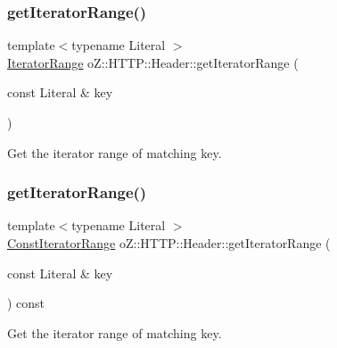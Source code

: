 \subsubsection{\texorpdfstring{getIteratorRange()}{getIteratorRange()}\hspace{0.1cm}{\footnotesize\ttfamily [1/2]}}
{\footnotesize\ttfamily template$<$typename Literal $>$ \\
\mbox{\hyperlink{classo_z_1_1_h_t_t_p_1_1_header_a226f04d25adf24d2a683f82ef8327812}{Iterator\+Range}} o\+Z\+::\+H\+T\+T\+P\+::\+Header\+::get\+Iterator\+Range (\begin{DoxyParamCaption}\item[{const Literal \&}]{key }\end{DoxyParamCaption})\hspace{0.3cm}{\ttfamily [inline]}}



Get the iterator range of matching key. 

\mbox{\label{classo_z_1_1_h_t_t_p_1_1_header_acecb2a9ed8e432a4a3ab9c6170d73793}} 
\subsubsection{\texorpdfstring{getIteratorRange()}{getIteratorRange()}\hspace{0.1cm}{\footnotesize\ttfamily [2/2]}}
{\footnotesize\ttfamily template$<$typename Literal $>$ \\
\mbox{\hyperlink{classo_z_1_1_h_t_t_p_1_1_header_a0823c7353e93de315929c96457563c3d}{Const\+Iterator\+Range}} o\+Z\+::\+H\+T\+T\+P\+::\+Header\+::get\+Iterator\+Range (\begin{DoxyParamCaption}\item[{const Literal \&}]{key }\end{DoxyParamCaption}) const\hspace{0.3cm}{\ttfamily [inline]}}



Get the iterator range of matching key. 

\mbox{\label{classo_z_1_1_h_t_t_p_1_1_header_a915a52b181112582d34e0942004d4cb0}} 
